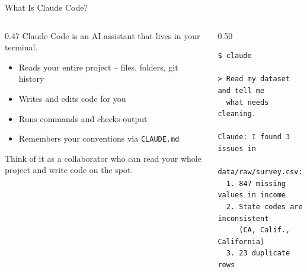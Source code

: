 \begin{frame}[fragile]{What Is Claude Code?}
  \begin{columns}[T]
    \begin{column}{0.47\textwidth}
      Claude Code is an AI assistant that lives in your terminal.

      \vspace{8pt}

      \begin{itemize}
        \item Reads your entire project -- files, folders, git history
        \item Writes and edits code for you
        \item Runs commands and checks output
        \item Remembers your conventions via \texttt{CLAUDE.md}
      \end{itemize}

      \vspace{8pt}

      Think of it as a collaborator who can read your whole project and write code on the spot.
    \end{column}
    \begin{column}{0.50\textwidth}
\begin{lstlisting}[style=terminal, basicstyle=\ttfamily\footnotesize\color{darkgray}]
$ claude

> Read my dataset and tell me
  what needs cleaning.

Claude: I found 3 issues in
  data/raw/survey.csv:
  1. 847 missing values in income
  2. State codes are inconsistent
     (CA, Calif., California)
  3. 23 duplicate rows
\end{lstlisting}
    \end{column}
  \end{columns}
\end{frame}

